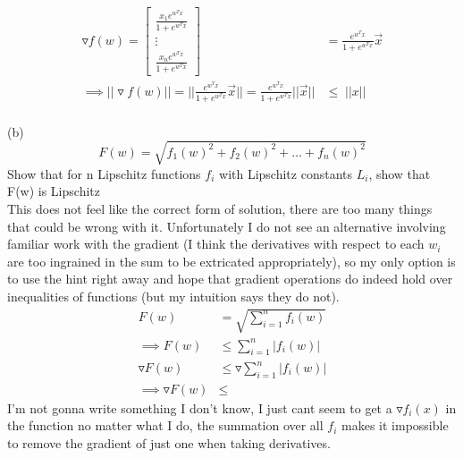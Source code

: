\documentclass[12pt,letterpaper]{article}
\begin{document}
\vspace{10pt}\\
\begin{equation*}
    \begin{split}
        \triangledown f(w) = \begin{bmatrix}
        \frac{x_1 e^{w^T x}}{1 + e^{w^T x}} 
        \\
        \vdots
        \\
        \frac{x_n e^{w^T x}}{1 + e^{w^T x}}
        \end{bmatrix}
        &= \frac{e^{w^T x}}{1 + e^{w^T x}} \Vec{x}
        \\
        \implies ||\triangledown f(w)|| = ||\frac{e^{w^T x}}{1 + e^{w^T x}} \Vec{x}|| = \frac{e^{w^T x}}{1 + e^{w^T x}}||\Vec{x}|| &\le\; ||x||
    \end{split}
\end{equation*}
\vspace{10pt}
\\
(b)
\[ F(w) = \sqrt{f_1(w)^2 + f_2(w)^2 + \dots + f_n(w)^2} \]
Show that for n Lipschitz functions $f_i$ with Lipschitz constants $L_i$, show that F(w) is Lipschitz 
\vspace{10pt}\\
This does not feel like the correct form of solution, there are too many things that could be wrong with it. Unfortunately I do not see an alternative involving familiar work with the gradient (I think the derivatives with respect to each $w_i$ are too ingrained in the sum to be extricated appropriately), so my only option is to use the hint right away and hope that gradient operations do indeed hold over inequalities of functions (but my intuition says they do not).
\begin{equation*}
    \begin{split}
        F(w) &= \sqrt{\sum_{i=1}^n f_i(w)}
        \\
       \implies F(w) &\le \sum_{i=1}^n{|f_i(w)|}
       \\
       \triangledown F(w) &\le \triangledown \sum_{i=1}^n{|f_i(w)|} 
       \\
       \implies \triangledown F(w) &\le\; 
    \end{split}
\end{equation*}
I'm not gonna write something I don't know, I just cant seem to get a $\triangledown f_i(x)$ in the function no matter what I do, the summation over all $f_i$ makes it impossible to remove the gradient of just one when taking derivatives. 
\vspace{10pt}
\end{document}
